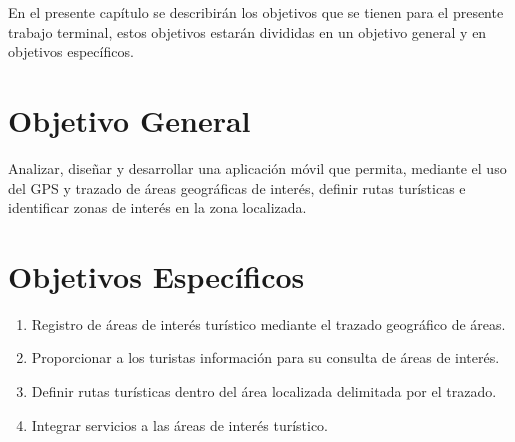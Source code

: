\vspace*{7cm}
\rightline{{\Huge \textcolor{sectionColor}{Objetivos}}}
\vspace*{2cm}


En el presente capítulo se describirán los objetivos que se tienen para el presente trabajo terminal, estos objetivos estarán divididas en un objetivo general y en objetivos específicos.

\section{Objetivo General}

Analizar, diseñar y desarrollar una aplicación móvil que permita, mediante el uso del GPS y trazado de áreas geográficas de interés, definir rutas turísticas e identificar zonas de interés en la zona localizada.

\section{Objetivos Específicos}

\begin{enumerate}
	\item Registro de áreas de interés turístico mediante el trazado geográfico de áreas.
	
	\item Proporcionar a los turistas información para su consulta de áreas de interés.
	
	\item Definir rutas turísticas dentro del área localizada delimitada por el trazado.
	
	\item Integrar servicios a las áreas de interés turístico.
\end{enumerate}

